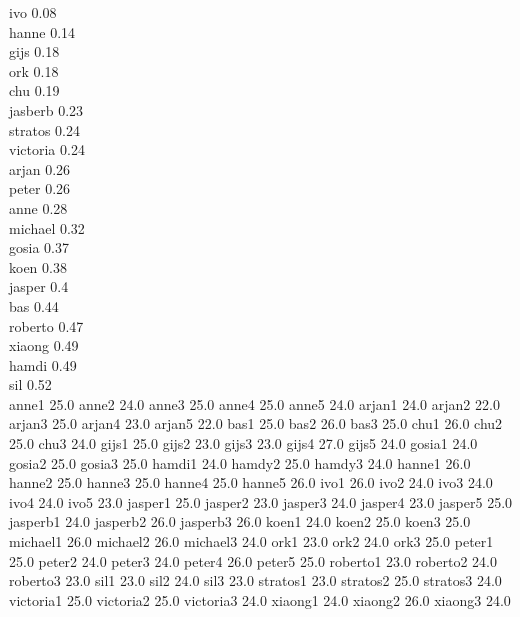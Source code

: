 ivo 0.08\\
hanne 0.14\\
gijs 0.18\\
ork 0.18\\
chu 0.19\\
jasberb 0.23\\
stratos 0.24\\
victoria 0.24\\
arjan 0.26\\
peter 0.26\\
anne 0.28\\
michael 0.32\\
gosia 0.37\\
koen 0.38\\
jasper  0.4\\
bas 0.44\\
roberto 0.47\\
xiaong 0.49\\
hamdi 0.49\\
sil 0.52\\




anne1 25.0
anne2 24.0
anne3 25.0
anne4 25.0
anne5 24.0
arjan1 24.0
arjan2 22.0
arjan3 25.0
arjan4 23.0
arjan5 22.0
bas1 25.0
bas2 26.0
bas3 25.0
chu1 26.0
chu2 25.0
chu3 24.0
gijs1 25.0
gijs2 23.0
gijs3 23.0
gijs4 27.0
gijs5 24.0
gosia1 24.0
gosia2 25.0
gosia3 25.0
hamdi1 24.0
hamdy2 25.0
hamdy3 24.0
hanne1 26.0
hanne2 25.0
hanne3 25.0
hanne4 25.0
hanne5 26.0
ivo1 26.0
ivo2 24.0
ivo3 24.0
ivo4 24.0
ivo5 23.0
jasper1 25.0
jasper2 23.0
jasper3 24.0
jasper4 23.0
jasper5 25.0
jasperb1 24.0
jasperb2 26.0
jasperb3 26.0
koen1 24.0
koen2 25.0
koen3 25.0
michael1 26.0
michael2 26.0
michael3 24.0
ork1 23.0
ork2 24.0
ork3 25.0
peter1 25.0
peter2 24.0
peter3 24.0
peter4 26.0
peter5 25.0
roberto1 23.0
roberto2 24.0
roberto3 23.0
sil1 23.0
sil2 24.0
sil3 23.0
stratos1 23.0
stratos2 25.0
stratos3 24.0
victoria1 25.0
victoria2 25.0
victoria3 24.0
xiaong1 24.0
xiaong2 26.0
xiaong3 24.0


